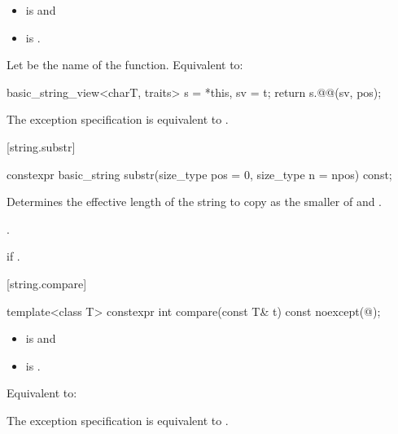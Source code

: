 \begin{itemdescr}
\pnum
\constraints
\begin{itemize}
\item
{} is
 and
\item
{} is
.
\end{itemize}

\pnum
\effects
Let  be the name of the function.
Equivalent to:
\begin{codeblock}
basic_string_view<charT, traits> s = *this, sv = t;
return s.@@(sv, pos);
\end{codeblock}

\pnum
\remarks
The exception specification is equivalent to
.
\end{itemdescr}

[string.substr]{}

%
\begin{itemdecl}
constexpr basic_string substr(size_type pos = 0, size_type n = npos) const;
\end{itemdecl}

\begin{itemdescr}
\pnum
\effects
Determines the effective length  of the string to copy as the smaller of  and
.

\pnum
\returns
{}.

\pnum
\throws
{}
if
.
\end{itemdescr}

[string.compare]{}

%
\begin{itemdecl}
template<class T>
  constexpr int compare(const T& t) const noexcept(@\seebelow@);
\end{itemdecl}

\begin{itemdescr}
\pnum
\constraints
\begin{itemize}
\item
{} is
 and
\item
{} is
.
\end{itemize}

\pnum
\effects
Equivalent to: 

\pnum
\remarks
The exception specification is equivalent to
.
\end{itemdescr}


